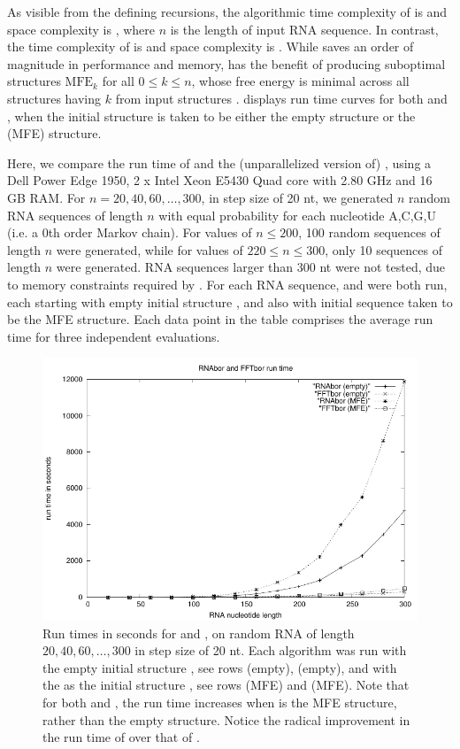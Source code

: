 As visible from the defining recursions, the algorithmic time complexity of
\rnabor is  and space complexity is , where $n$ is
the length of input RNA sequence. In contrast, the time complexity of
\fftbor is  and space complexity is .
While \fftbor saves an order of magnitude in performance and memory,
\rnabor has the benefit of producing suboptimal structures $\text{MFE}_k$
for all $0 \leq k \leq n$, whose free energy is minimal across all structures
having \bpd $k$ from input structures \strSt.
 displays run time curves for both
\rnabor and \fftbor, when the initial structure \strSt is
taken to be either the empty structure or the \mfe
(MFE) structure.

Here, we compare the run time of \rnabor \citep{freyhult.b07} and
the (unparallelized version of) \fftbor, using
a Dell Power Edge 1950, 2 x Intel Xeon E5430 Quad
core with 2.80 GHz and 16 GB RAM. For $n = 20,40,60,\dots,300$, in step
size of 20 nt, we generated $n$ random RNA sequences of length $n$ with equal
probability for each nucleotide A,C,G,U (i.e. a $0$th order Markov chain).
For values of $n \leq 200$, 100 random sequences of length
$n$ were generated, while for values of $220 \leq n \leq 300$, only
10 sequences of length $n$ were generated.
RNA sequences larger than 300 nt were not tested,
due to  memory constraints required by \rnabor.
For each RNA sequence, \rnabor and \fftbor were both run,
each starting with empty initial structure \strSt, and also
with initial sequence \strSt taken to be the MFE structure.
Each data point in the table comprises the average run time for three
independent evaluations.

\begin{figure}[!ht]
\centering
\includegraphics[width=.9\textwidth]{Figures/FFTbor/benchmarking.pdf}
\caption{Run times in seconds for \rnabor and \fftbor, on random RNA
of length $20,40,60,\dots,300$ in step size of 20 nt. Each algorithm
was run with the empty initial structure \strSt, see rows
\rnabor (empty), \fftbor (empty), and with the \mfes as the initial structure
\strSt, see rows
\rnabor (MFE) and \fftbor (MFE). Note that for both \rnabor
and \fftbor, the run time increases when \strSt is the MFE structure,
rather than the empty structure. Notice the radical improvement in the
run time of \fftbor over that of \rnabor.
}
\label{fig:fftbor:benchmarking}
\end{figure}

